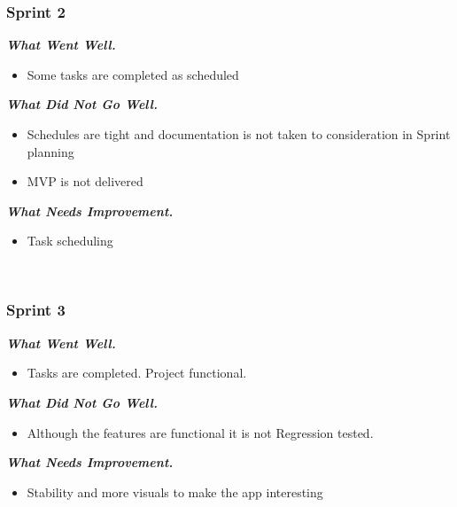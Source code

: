 \documentclass{article}
\begin{document}
    \subsubsection{Sprint 2}
        \textbf{\emph{What Went Well.}}
        \begin{itemize}
            \item Some tasks are completed as scheduled
        \end{itemize}
        \textbf{\emph{What Did Not Go Well.}}
        \begin{itemize}
            \item Schedules are tight and documentation is not taken to consideration in Sprint planning
            \item MVP is not delivered
        \end{itemize}
        \textbf{\emph{What Needs Improvement.}}
            \begin{itemize}
                \item Task scheduling
            \end{itemize}~\\
    \subsubsection{Sprint 3}
        \textbf{\emph{What Went Well.}}
            \begin{itemize}
                \item Tasks are completed.  Project functional.
            \end{itemize}
        \textbf{\emph{What Did Not Go Well.}}
            \begin{itemize}
                \item Although the features are functional it is not Regression tested.
            \end{itemize}
        \textbf{\emph{What Needs Improvement.}}
            \begin{itemize}
                \item Stability and more visuals to make the app interesting
            \end{itemize}

\newpage
\end{document}
